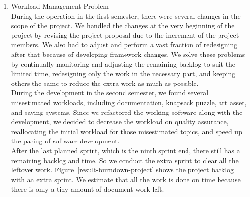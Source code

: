\documentclass[12pt,oneside,openright,a4paper]{cpe-english-project}
\begin{document}
\begin{enumerate}
	\item Workload Management Problem \\
	During the operation in the first semester, there were several changes in the scope of the project. We handled the changes at the very beginning of the project by revising the project proposal due to the increment of the project members. We also had to adjust and perform a vast fraction of redesigning after that because of developing framework changes. We solve these problems by continually monitoring and adjusting the remaining backlog to suit the limited time, redesigning only the work in the necessary part, and keeping others the same to reduce the extra work as much as possible. \\
	During the development in the second semester, we found several misestimated workloads, including documentation, knapsack puzzle, art asset, and saving systems. Since we refactored the working software along with the development, we decided to decrease the workload on quality assurance, reallocating the initial workload for those misestimated topics, and speed up the pacing of software development. \\
	After the last planned sprint, which is the ninth sprint end, there still has a remaining backlog and time. So we conduct the extra sprint to clear all the leftover work. Figure~\ref{result-burndown-project} shows the project backlog with an extra sprint. We estimate that all the work is done on time because there is only a tiny amount of document work left. \\
	\begin{minipage}[c]{\textwidth}\centering
	\label{fig:result-burndown-project}
	\end{minipage}


\end{enumerate}
\end{document}
